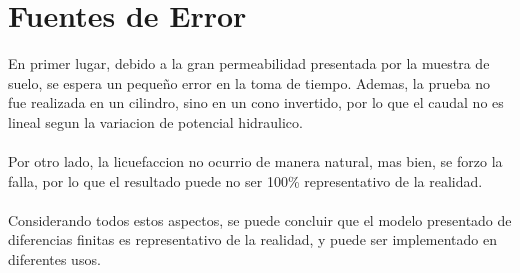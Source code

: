 \section{Fuentes de Error}

En primer lugar, debido a la gran permeabilidad presentada por la muestra de suelo, se espera un pequeño error en la toma de tiempo. Ademas, la prueba no fue realizada en un cilindro, sino en un cono invertido, por lo que el caudal no es lineal segun la variacion de potencial hidraulico.
\\ \\
Por otro lado, la licuefaccion no ocurrio de manera natural, mas bien, se forzo la falla, por lo que el resultado puede no ser 100\% representativo de la realidad.
\\ \\
Considerando todos estos aspectos, se puede concluir que el modelo presentado de diferencias finitas es representativo de la realidad, y puede ser implementado en diferentes usos.

